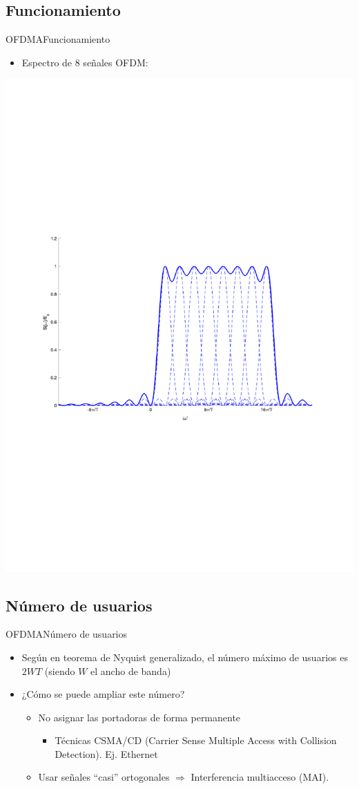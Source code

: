 \documentclass[10pt,compress]{beamer} %
\begin{document}
\subsection{Funcionamiento}
\begin{frame}{OFDMA}{Funcionamiento}
  \begin{itemize}
    \item Espectro de 8 señales OFDM:
  \end{itemize}
  \centering \includegraphics[width=0.8\linewidth]{../Apuntes/Figuras/OFDM.pdf}
\end{frame}

\subsection{Número de usuarios}
\begin{frame}{OFDMA}{Número de usuarios}
  \begin{itemize}
    \item Según en teorema de Nyquist generalizado, el número máximo de usuarios es $2WT$ (siendo $W$ el ancho de banda)
    \item ¿Cómo se puede ampliar este número?
      \begin{itemize}
        \item No asignar las portadoras de forma permanente
        \begin{itemize}
          \item Técnicas CSMA/CD (Carrier Sense Multiple Access with Collision Detection). Ej. Ethernet
        \end{itemize}
        \item Usar señales ``casi'' ortogonales $\Rightarrow$ Interferencia multiacceso (MAI).
      \end{itemize}
  \end{itemize}
\end{frame}
\end{document}
